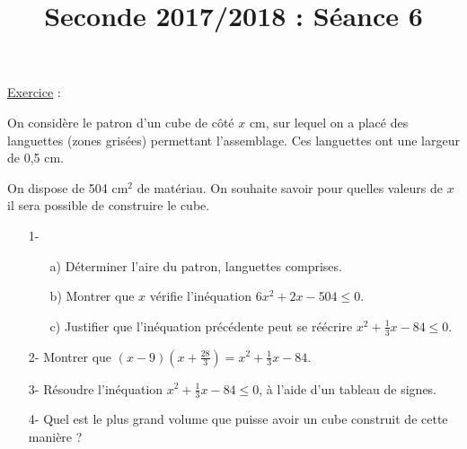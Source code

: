 \documentclass[12pt]{article}
\title{Seconde 2017/2018 : Séance 6}
\author{}
\date{}
\begin{document}
\underline{Exercice} :

\vspace{0.3cm}

On considère le patron d'un cube de côté $x$ cm, sur lequel on a placé des languettes (zones grisées) permettant l'assemblage. Ces languettes ont une largeur de 0,5 cm.

\begin{figure}[H]
\center
{}
\end{figure}

On dispose de 504 cm$^{2}$ de matériau. On souhaite savoir pour quelles valeurs de $x$ il sera possible de construire le cube.

\vspace{0.3cm}

\begin{itemize}
\item[1-] \begin{itemize}
\item[a)] Déterminer l'aire du patron, languettes comprises.

\vspace{0.3cm}

\item[b)] Montrer que $x$ vérifie l'inéquation $\displaystyle 6x^{2} + 2x - 504 \leq 0$.

\vspace{0.3cm}

\item[c)] Justifier que l'inéquation précédente peut se réécrire $\displaystyle x^{2} + \frac{1}{3}x - 84 \leq 0$.
\end{itemize}

\vspace{0.3cm}

\item[2-] Montrer que $\displaystyle \left(x - 9 \right) \left(x + \frac{28}{3} \right) = x^{2} + \frac{1}{3}x - 84$.

\vspace{0.3cm}

\item[3-] Résoudre l'inéquation $\displaystyle x^{2} + \frac{1}{3}x - 84 \leq 0$, à l'aide d'un tableau de signes.

\vspace{0.3cm}

\item[4-] Quel est le plus grand volume que puisse avoir un cube construit de cette manière ?
\end{itemize}
\end{document}

